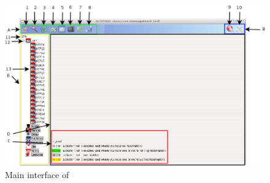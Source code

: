 \begin{figure}[H]
\centering
\includegraphics[width=\linewidth]{figures/GRUDU_interface_schema.eps}
\caption{Main interface of \grudu}
\label{fig:GRUDU_main}
\end{figure}

